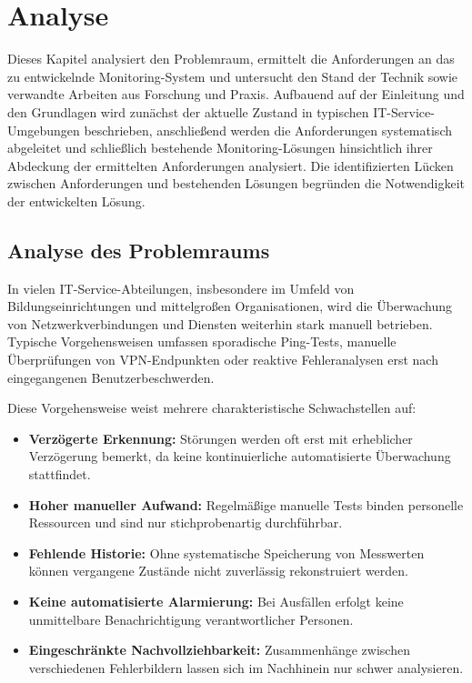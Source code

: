 \chapter{Analyse}
\label{ch:analyse}

Dieses Kapitel analysiert den Problemraum, ermittelt die Anforderungen an das zu entwickelnde Monitoring-System und untersucht den Stand der Technik sowie verwandte Arbeiten aus Forschung und Praxis. Aufbauend auf der Einleitung und den Grundlagen wird zunächst der aktuelle Zustand in typischen IT-Service-Umgebungen beschrieben, anschließend werden die Anforderungen systematisch abgeleitet und schließlich bestehende Monitoring-Lösungen hinsichtlich ihrer Abdeckung der ermittelten Anforderungen analysiert. Die identifizierten Lücken zwischen Anforderungen und bestehenden Lösungen begründen die Notwendigkeit der entwickelten Lösung.

\section{Analyse des Problemraums}
\label{sec:problemraumanalyse}

In vielen IT-Service-Abteilungen, insbesondere im Umfeld von Bildungseinrichtungen und mittelgroßen Organisationen, wird die Überwachung von Netzwerkverbindungen und Diensten weiterhin stark manuell betrieben. Typische Vorgehensweisen umfassen sporadische Ping-Tests, manuelle Überprüfungen von VPN-Endpunkten oder reaktive Fehleranalysen erst nach eingegangenen Benutzerbeschwerden.

Diese Vorgehensweise weist mehrere charakteristische Schwachstellen auf:

\begin{itemize}
    \item \textbf{Verzögerte Erkennung:} Störungen werden oft erst mit erheblicher Verzögerung bemerkt, da keine kontinuierliche automatisierte Überwachung stattfindet.
    \item \textbf{Hoher manueller Aufwand:} Regelmäßige manuelle Tests binden personelle Ressourcen und sind nur stichprobenartig durchführbar.
    \item \textbf{Fehlende Historie:} Ohne systematische Speicherung von Messwerten können vergangene Zustände nicht zuverlässig rekonstruiert werden.
    \item \textbf{Keine automatisierte Alarmierung:} Bei Ausfällen erfolgt keine unmittelbare Benachrichtigung verantwortlicher Personen.
    \item \textbf{Eingeschränkte Nachvollziehbarkeit:} Zusammenhänge zwischen verschiedenen Fehlerbildern lassen sich im Nachhinein nur schwer analysieren.
\end{itemize}

